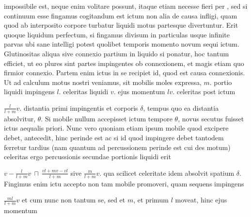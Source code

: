impossibile est, neque enim 
volitare possunt, itaque etiam necesse 
fieri per ,
sed si continuum esse fingamus cogitandum est ictum non alia de causa infligi, quam quod ab interposito corpore turbatur liquidi motus partesque divertuntur. Erit quoque liquidum perfectum, si fingamus divisum in particulas usque infinite parvas ubi sane intelligi 
potest quolibet temporis momento novum sequi ictum. Glutinositas aliqua sive connexio partium in liquido si ponatur, hoc tantum efficiet, ut eo plures sint partes impingentes ob connexionem, et magis etiam quo firmior connexio. Partem enim ictus in se recipiet id, quod est causa connexionis.
\pend
\count{}
\count{}
\pstart
Ut ad calculum motus nostri veniamus, sit mobilis moles\protect{} expressa, $\displaystyle m$. portio 
liquidi impingens $\displaystyle l$. celeritas liquidi $\displaystyle v$. ejus momentum\protect{} $\displaystyle lv$. celeritas post ictum \rule[-4mm]{0mm}{10mm}$\displaystyle \frac{l}{l + m} v$. distantia primi impingentis et corporis $\displaystyle \delta$, tempus quo ea distantia absolvitur, $\displaystyle \theta$. Si mobile nullum accepisset ictum  tempore $\displaystyle \theta$, novus secutus fuisset ictus aequalis priori. Nunc vero quoniam etiam ipsum mobile quod excipere debet, antecedit, hinc perinde est ac si id quod impingere debet tantodem ferretur tardius (nam quantum ad 
percussionem perinde est cui des motum) celeritas ergo percussionis secundae portionis liquidi erit \rule[-4mm]{0mm}{10mm}$\displaystyle v - \frac{l}{l + m} v \ \sqcap \ \frac{vl + mv - vl}{l + m}$ sive $\displaystyle \frac{m}{l + m} v$. qua scilicet celeritate idem absolvit spatium\protect{} $\displaystyle \delta$. Fingimus enim ictu accepto non tam mobile promoveri, quam sequens impingens 
\rule[-4mm]{0mm}{10mm}$\displaystyle \frac{ml}{l + m} v$ et cum nunc non tantum se, sed et $\displaystyle m$, et primum $\displaystyle l$ moveat, hinc ejus momentum 
